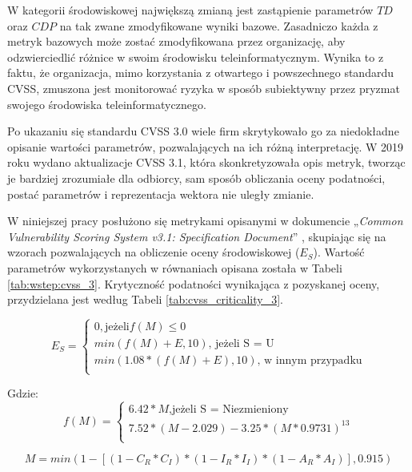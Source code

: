 \bigbreak
W kategorii środowiskowej największą zmianą jest zastąpienie parametrów $TD$ oraz $CDP$ na tak zwane zmodyfikowane wyniki bazowe. Zasadniczo każda z metryk bazowych może zostać zmodyfikowana przez organizację, aby odzwierciedlić różnice w swoim środowisku teleinformatycznym. Wynika to z faktu, że organizacja, mimo korzystania z otwartego i powszechnego standardu CVSS, zmuszona jest monitorować ryzyka w sposób subiektywny przez pryzmat swojego środowiska teleinformatycznego.

\bigbreak
Po ukazaniu się standardu CVSS 3.0 wiele firm skrytykowało go za niedokładne opisanie wartości parametrów, pozwalających na ich różną interpretację. W 2019 roku wydano aktualizacje CVSS 3.1, która skonkretyzowała opis metryk, tworząc je bardziej zrozumiałe dla odbiorcy, sam sposób obliczania oceny podatności, postać parametrów i reprezentacja wektora nie uległy zmianie.

\bigbreak
W niniejszej pracy posłużono się metrykami opisanymi w dokumencie „\emph{Common Vulnerability Scoring System v3.1: Specification Document}” \cite{cvs2019specification}, skupiając się na wzorach pozwalających na obliczenie oceny środowiskowej ($E_S$). Wartość parametrów wykorzystanych w równaniach opisana została w Tabeli \ref{tab:wstep:cvss_3}. Krytyczność podatności wynikająca z pozyskanej oceny, przydzielana jest według Tabeli \ref{tab:cvss_criticality_3}.

\begin{equation}
E_S = 
\begin{cases}
0, \text{jeżeli} f(M) \leq 0 \\
min(f(M) + E, 10)\text{, jeżeli S = U} \\
min(1.08 * (f(M) + E), 10)\text{, w innym przypadku} \\
\end{cases}
\end{equation}

Gdzie:
\begin{equation}
f(M) = 
\begin{cases}
6.42 * M\text{,jeżeli S = Niezmieniony} \\
7.52 * (M - 2.029) - 3.25 * (M * 0. 9731)^{13} \\
\end{cases}
\end{equation}

\begin{equation}
M = min(1 - [(1 - C_R * C_I) * (1 - I_R * I_I) * (1 - A_R * A_I)], 0.915)
\end{equation}

